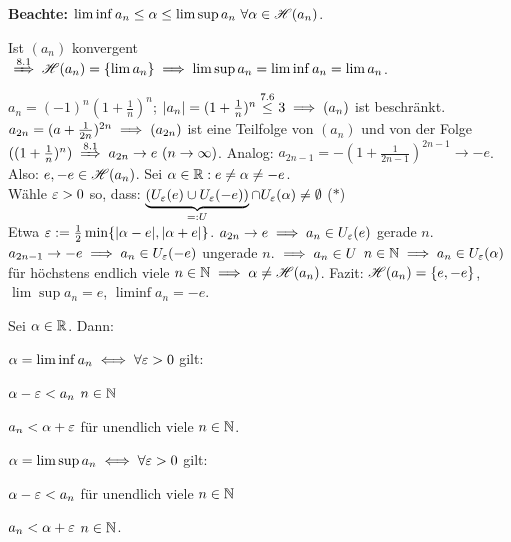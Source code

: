 \documentclass[a4paper,twoside,DIV15,BCOR12mm]{scrbook}
\begin{document}
\textbf{Beachte:} $\liminf a_n \le \alpha \le \limsup a_n \ \forall \alpha \in\mathscr{H}(a_n)$.

\begin{beispiele}
\item Ist $(a_n)$ konvergent $\folgtwegen{8.1} \H(a_n) = \{\lim a_n\} \folgt \limsup a_n = \liminf a_n = \lim a_n$.
\item $a_n = (-1)^n(1+\frac{1}{n})^n$; $|a_n| = (1+\frac{1}{n})^n \stackrel{\text{7.6}}{\le} 3 \implies (a_n)$ ist beschränkt. \\
$a_{2n} = (a + \frac{1}{2n})^{2n} \implies (a_{2n})$ ist eine Teilfolge von $(a_n)$ und von der Folge $((1+\frac{1}{n})^n)  \folgtnach{8.1} a_{2n} \to e \ (n\to\infty)$. Analog: $a_{2n-1} = -(1 + \frac{1}{2n-1})^{2n-1} \to -e $. Also: $e, -e \in \mathscr{H}(a_n)$. Sei $\alpha \in \mathbb{R}: e \ne \alpha \ne -e$.\\
Wähle $\varepsilon > 0$ so, dass: $\displaystyle\underbrace{(U_\varepsilon(e) \cup U_\varepsilon(-e))}_{=:U} \cap U_\varepsilon(\alpha) \ne \emptyset$ ($*$)\\
Etwa $\varepsilon := \frac{1}{2} \min\{|\alpha-e|, |\alpha+e|\}$. $a_{2n} \to e \implies a_n \in U_\varepsilon(e)$ \ffa gerade $n$. $a_{2n-1} \to -e \implies a_n\in U_\varepsilon(-e)$ \ffa ungerade $n$. $\implies a_n \in U$ \ffa $n\in\mathbb{N} \implies a_n\in U_\varepsilon(\alpha)$ für höchstens endlich viele $n\in\mathbb{N} \implies \alpha \ne \mathscr{H}(a_n)$. Fazit: $\mathscr{H}(a_n) = \{e, -e\}$, $\lim\sup a_n=e$, $\liminf a_n = -e$.
\end{beispiele}

\begin{satz}
Sei $\alpha \in \mathbb{R}$. Dann:

$ \alpha = \lim\inf a_n \iff \forall \varepsilon>0$ gilt:

\begin{liste}
\item $\alpha - \varepsilon < a_n$ \ffa $n\in\mathbb{N}$
\item $a_n<\alpha+\varepsilon$ für unendlich viele $n\in\mathbb{N}$.
\end{liste}

$ \alpha = \lim\sup a_n \iff \forall \varepsilon>0$ gilt:
\begin{liste}
\item $\alpha - \varepsilon < a_n$ für unendlich viele $n\in\mathbb{N}$
\item $a_n<\alpha+\varepsilon$ \ffa $n\in\mathbb{N}$.
\end{liste}
\end{satz}
\end{document}
